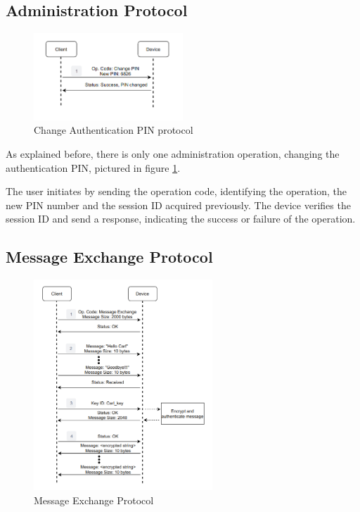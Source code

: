 \subsection{Administration Protocol} \label{chap:sol:protocol:admin}
\begin{figure}[h]
    \centering
    \includegraphics[width=0.5\textwidth]{./Images/change-PIN.png}
    \caption{Change Authentication PIN protocol}
    \label{fig:protocol:change-PIN}
\end{figure}

As explained before, there is only one administration operation, changing the authentication PIN, pictured in figure \ref{fig:protocol:change-PIN}.

The user initiates by sending the operation code, identifying the operation, the new PIN number and the session ID acquired previously. The device verifies the session ID and send a response, indicating the success or failure of the operation.

\subsection{Message Exchange Protocol} \label{chap:sol:protocol:message}

\begin{figure}[h]
\centering
\includegraphics[width=0.6\textwidth]{./Images/message-exchange.png}
\caption{Message Exchange Protocol}
\label{fig:protocol:message-exchange}
\end{figure}

